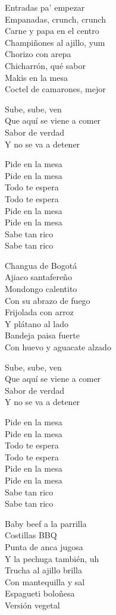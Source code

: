 \begin{lyrics}
Entradas pa' empezar\\
Empanadas, crunch, crunch\\
Carne y papa en el centro\\
Champiñones al ajillo, yum\\
Chorizo con arepa\\
Chicharrón, qué sabor\\
Makis en la mesa\\
Coctel de camarones, mejor

Sube, sube, ven\\
Que aquí se viene a comer\\
Sabor de verdad\\
Y no se va a detener

Pide en la mesa\\
Pide en la mesa\\
Todo te espera\\
Todo te espera\\
Pide en la mesa\\
Pide en la mesa\\
Sabe tan rico\\
Sabe tan rico

Changua de Bogotá\\
Ajiaco santafereño\\
Mondongo calentito\\
Con su abrazo de fuego\\
Frijolada con arroz\\
Y plátano al lado\\
Bandeja paisa fuerte\\
Con huevo y aguacate alzado

Sube, sube, ven\\
Que aquí se viene a comer\\
Sabor de verdad\\
Y no se va a detener

Pide en la mesa\\
Pide en la mesa\\
Todo te espera\\
Todo te espera\\
Pide en la mesa\\
Pide en la mesa\\
Sabe tan rico\\
Sabe tan rico

Baby beef a la parrilla\\
Costillas BBQ\\
Punta de anca jugosa\\
Y la pechuga también, uh\\
Trucha al ajillo brilla\\
Con mantequilla y sal\\
Espagueti boloñesa\\
Versión vegetal


\end{lyrics}
